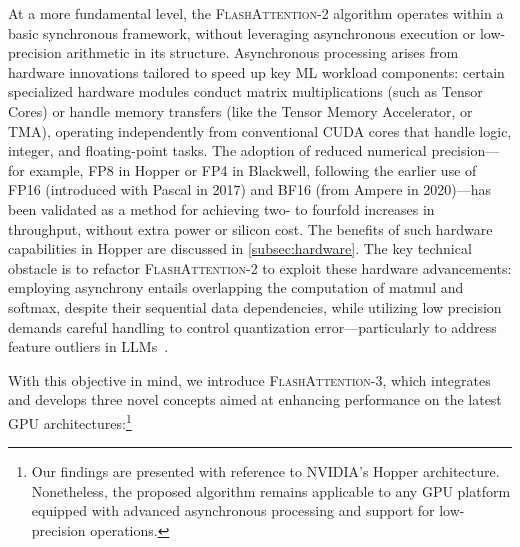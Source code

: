 At a more fundamental level, the \textsc{FlashAttention-2} algorithm operates within a basic synchronous framework, without leveraging asynchronous execution or low-precision arithmetic in its structure. Asynchronous processing arises from hardware innovations tailored to speed up key ML workload components: certain specialized hardware modules conduct matrix multiplications (such as Tensor Cores) or handle memory transfers (like the Tensor Memory Accelerator, or TMA), operating independently from conventional CUDA cores that handle logic, integer, and floating-point tasks. The adoption of reduced numerical precision—for example, FP8 in Hopper or FP4 in Blackwell, following the earlier use of FP16 (introduced with Pascal in 2017) and BF16 (from Ampere in 2020)—has been validated as a method for achieving two- to fourfold increases in throughput, without extra power or silicon cost. The benefits of such hardware capabilities in Hopper are discussed in \cref{subsec:hardware}. 
The key technical obstacle is to refactor \textsc{FlashAttention-2} to exploit these hardware advancements: employing asynchrony entails overlapping the computation of matmul and softmax, despite their sequential data dependencies, while utilizing low precision demands careful handling to control quantization error—particularly to address feature outliers in LLMs~\citep{dettmers2208llm, sun2024massive}.

With this objective in mind, we introduce \textsc{FlashAttention-3}, which integrates and develops three novel concepts aimed at enhancing performance on the latest GPU architectures:\footnote{Our findings are presented with reference to NVIDIA's Hopper architecture. Nonetheless, the proposed algorithm remains applicable to any GPU platform equipped with advanced asynchronous processing and support for low-precision operations.}

